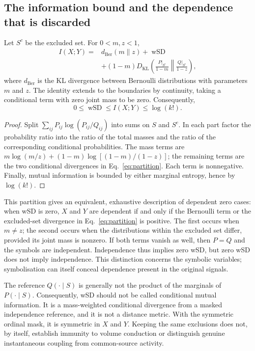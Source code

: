 \subsection{The information bound and the dependence that is discarded}
\begin{proposition}
Let $S^c$ be the excluded set. For $0<m,z<1$,
\begin{align}
I(X;Y)={}&d_{\mathrm{Ber}}(m\|z)+\operatorname{wSD}\nonumber\\
&+(1-m)D_{\mathrm{KL}}\!\left(
\frac{P|_{S^c}}{1-m}\middle\|\frac{Q|_{S^c}}{1-z}\right),
\label{eq:partition}
\end{align}
where $d_{\mathrm{Ber}}$ is the KL divergence between Bernoulli distributions with parameters $m$ and $z$. The identity extends to the boundaries by continuity, taking a conditional term with zero joint mass to be zero. Consequently,
\begin{equation}
0\leq\operatorname{wSD}\leq I(X;Y)\leq\log(k!).
\end{equation}
\end{proposition}
\begin{proof}
Split $\sum_{ij}P_{ij}\log(P_{ij}/Q_{ij})$ into sums on $S$ and $S^c$. In each part factor the probability ratio into the ratio of the total masses and the ratio of the corresponding conditional probabilities. The mass terms are $m\log(m/z)+(1-m)\log[(1-m)/(1-z)]$; the remaining terms are the two conditional divergences in Eq.~\eqref{eq:partition}. Each term is nonnegative. Finally, mutual information is bounded by either marginal entropy, hence by $\log(k!)$.
\end{proof}

This partition gives an equivalent, exhaustive description of dependent zero cases: when wSD is zero, $X$ and $Y$ are dependent if and only if the Bernoulli term or the excluded-set divergence in Eq.~\eqref{eq:partition} is positive. The first occurs when $m\ne z$; the second occurs when the distributions within the excluded set differ, provided its joint mass is nonzero. If both terms vanish as well, then $P=Q$ and the symbols are independent. Independence thus implies zero wSD, but zero wSD does not imply independence. This distinction concerns the symbolic variables; symbolisation can itself conceal dependence present in the original signals.

The reference $Q(\cdot\mid S)$ is generally not the product of the marginals of $P(\cdot\mid S)$. Consequently, wSD should not be called conditional mutual information. It is a mass-weighted conditional divergence from a masked independence reference, and it is not a distance metric. With the symmetric ordinal mask, it is symmetric in $X$ and $Y$. Keeping the same exclusions does not, by itself, establish immunity to volume conduction or distinguish genuine instantaneous coupling from common-source activity.


